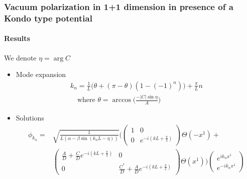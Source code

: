 \documentclass[french]{beamer}
\begin{document}
\begin{frame}[shrink=10]
\frametitle{Vacuum polarization in 1+1 dimension in presence of a Kondo type potential}
\framesubtitle{Results}

We denote $\eta = \arg C$

\begin{itemize}

\item Mode expansion
\begin{equation*}
\begin{split}
k_{n} = \frac{1}{L} \big(\theta + (\pi - \theta)(1- (-1)^n)\big) + \frac{\pi}{L}n \\
\quad \textrm{where $\theta = \arccos\bigg( \frac{-|C| \sin \eta}{A} \bigg)$}
\end{split}
\end{equation*}


\item Solutions
\begin{equation*}
\begin{split}
\phi_{k_{n}} = 
& \sqrt{\frac{1}{L(\alpha - \beta \sin (k_{n}L - \eta))}} \Bigg( 
\begin{pmatrix}
1 & 0 \\
0  & e^{-i(kL + \frac{\pi}{2})}
\end{pmatrix}
\Theta(-x^1) + \\
& \begin{pmatrix}
\frac{A}{D}  +  \frac{C}{D} e^{-i(kL + \frac{\pi}{2})} & 0 \\
0  & \frac{C^*}{D}  + \frac{A}{D}e^{-i(kL + \frac{\pi}{2})}
\end{pmatrix}\Theta(x^1)\Bigg)
\begin{pmatrix}
e^{ik_{n} x^1} \\
e^{- ik_{n} x^1}
\end{pmatrix}
\end{split}
\end{equation*}


\end{itemize}

\end{frame}
\end{document}
